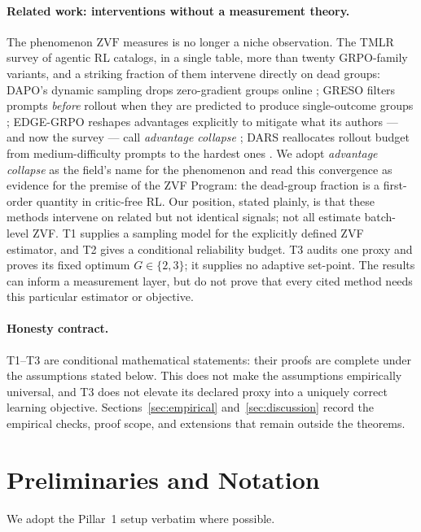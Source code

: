 \documentclass[11pt]{article}
\theoremstyle{plain}
\theoremstyle{definition}
\theoremstyle{remark}
\newcommand{\ZVF}{\ensuremath{\mathrm{ZVF}}}
\newcommand{\1}{\mathbb{1}}
\begin{document}
\paragraph{Related work: interventions without a measurement theory.}
The phenomenon \ZVF{} measures is no longer a niche observation. The TMLR
survey of agentic RL \cite{agenticrlsurvey2026} catalogs, in a single table,
more than twenty GRPO-family variants, and a striking fraction of them
intervene directly on dead groups: DAPO's dynamic sampling drops
zero-gradient groups online \cite{yu2025dapo}; GRESO filters prompts
\emph{before} rollout when they are predicted to produce single-outcome
groups \cite{greso2025}; EDGE-GRPO reshapes advantages explicitly to
mitigate what its authors --- and now the survey --- call \emph{advantage
collapse} \cite{edgegrpo2025}; DARS reallocates rollout budget from
medium-difficulty prompts to the hardest ones \cite{dars2025}. We adopt
\emph{advantage collapse} as the field's name for the phenomenon and read
this convergence as evidence for the premise of the ZVF Program: the
dead-group fraction is a first-order quantity in critic-free RL. Our
position, stated plainly, is that these methods intervene on related but not
identical signals; not all estimate batch-level ZVF. T1 supplies a sampling
model for the explicitly defined ZVF estimator, and T2 gives a conditional
reliability budget. T3 audits one proxy and proves its fixed optimum
$G\in\{2,3\}$; it supplies no adaptive set-point. The results can inform a
measurement layer, but do not prove that every cited method needs this
particular estimator or objective.

\paragraph{Honesty contract.} T1--T3 are conditional mathematical statements:
their proofs are complete under the assumptions stated below. This does not make
the assumptions empirically universal, and T3 does not elevate its declared
proxy into a uniquely correct learning objective.
Sections~\ref{sec:empirical} and~\ref{sec:discussion} record the empirical
checks, proof scope, and extensions that remain outside the theorems.

\section{Preliminaries and Notation}\label{sec:prelim}
We adopt the Pillar~1 setup verbatim where possible.
\end{document}
